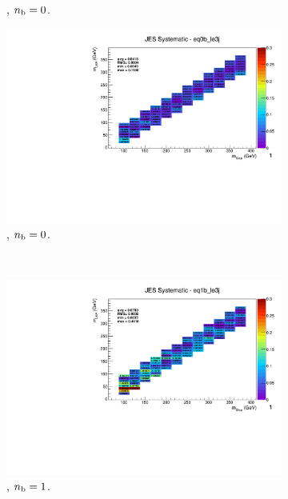 \begin{figure}[ht!]
\begin{subfigure}[b]{0.32\textwidth}
    \caption{\njlow, $n_{\text{b}} = 0$.}
  \end{subfigure}
  \begin{subfigure}[b]{0.32\textwidth}
    \includegraphics[width=\textwidth, page=1]{Figs/sms/t2degen/v19_2/systs/T2_4body_JES_eq0b_le3j.pdf}
    \caption{\njlow, $n_{\text{b}} = 0$.}
    \label{fig:sms-jes-tdegen-le3j-0b}
  \end{subfigure}\\
  \begin{subfigure}[b]{0.32\textwidth}
    \includegraphics[width=\textwidth, page=12]{Figs/sms/t2degen/v19_2/systs/T2_4body_JES_eq1b_le3j.pdf}
    \caption{\njlow, $n_{\text{b}} = 1$.}
  \end{subfigure}
  \begin{subfigure}[b]{0.32\textwidth}

\end{subfigure}
\end{figure}
